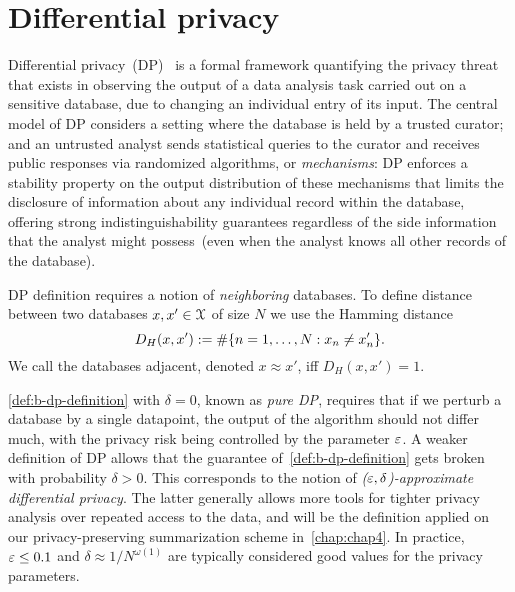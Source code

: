 \section{Differential privacy}
\label{sec:bdp}

Differential privacy~(DP)~\citep{dwork2006calibrating,dwork14} is a formal framework quantifying the privacy threat that exists in observing the output of a data analysis task carried out on a sensitive database, due to changing an individual entry of its input. The central model of DP considers a setting where the database is held by a trusted curator; and an untrusted analyst sends statistical queries to the curator and receives public responses via randomized algorithms, or \emph{mechanisms}: DP enforces a stability property on the output distribution of these mechanisms that limits the disclosure of information about any individual record within the database, offering strong indistinguishability guarantees regardless of the side information that the analyst might possess~(even when the analyst knows all other records of the database). 

DP definition requires a notion of \emph{neighboring} databases.
To define distance between two databases $x, x' \in \mathcal{X}$ of size $ N $ we use the Hamming distance
\[
D_{H}(x, x') := \#\{n=1,\ldots,N: x_n \neq x'_n \}.
\]
We call the databases adjacent, denoted $ x \approx x'$, iff $D_{H}(x, x')=1$.


\label{sec:b-differential-privacy}

\cref{def:b-dp-definition} with $\delta=0$, known as \emph{pure DP}, requires that if we perturb a database by a single datapoint, the output of the algorithm should not differ much, with the privacy risk being controlled by the parameter $\varepsilon$.
A weaker definition of DP allows that the guarantee of~\cref{def:b-dp-definition} gets broken with probability $\delta>0$. This corresponds to the notion of \emph{($\varepsilon, \delta$)-approximate differential privacy}. The latter generally allows more tools for tighter privacy analysis over repeated access to the data, and will be the definition applied on our privacy-preserving summarization scheme in~\cref{chap:chap4}. In practice, $\varepsilon \leq 0.1$ and $\delta \approx 1/N^{\omega(1)}$ are typically considered good values for the privacy parameters. 

